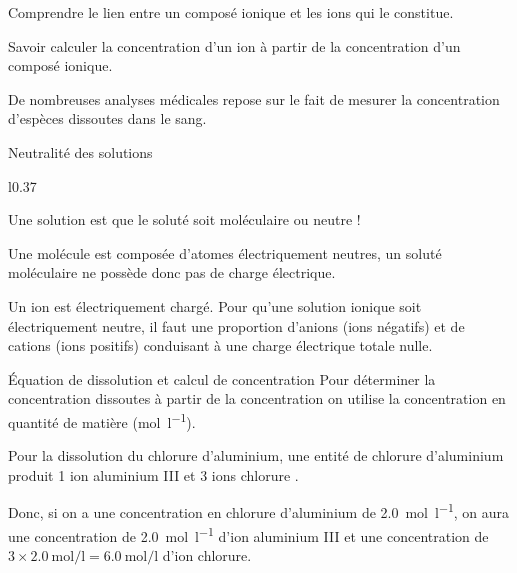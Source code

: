 \teteTermStssDosa
{}

\begin{objectifs}
  \item Comprendre le lien entre un composé ionique et les ions qui le constitue.
  \item Savoir calculer la concentration d'un ion à partir de la concentration d'un composé ionique.
\end{objectifs}

\begin{contexte}
  De nombreuses analyses médicales repose sur le fait de mesurer la concentration d'espèces dissoutes dans le sang.
  
\end{contexte}


\begin{doc}{Neutralité des solutions}
  \begin{wrapfigure}[9]{l}{0.37\linewidth}
    \vspace*{-18pt}
  \end{wrapfigure}
  Une solution est  que le soluté soit moléculaire ou neutre !

  Une molécule est composée d'atomes électriquement neutres, un soluté moléculaire ne possède donc pas de charge électrique.
  
  Un ion est électriquement chargé. Pour qu'une solution ionique soit électriquement neutre, il faut une proportion d'anions (ions négatifs) et de cations (ions positifs) conduisant à une charge électrique totale nulle.

\end{doc}

\begin{doc}{Équation de dissolution et calcul de concentration}
  Pour déterminer la concentration  dissoutes à partir de la concentration  on utilise la concentration en quantité de matière (\unit{\mole\per\litre}).
  \medskip

  \exemple Pour la dissolution du chlorure d'aluminium, une entité de chlorure d'aluminium  produit 1 ion aluminium III  et 3 ions chlorure \chlorure.

  Donc, si on a une concentration en chlorure d'aluminium de \qty{2,0}{\mole\per\litre}, on aura une concentration de \qty{2,0}{\mole\per\litre} d'ion aluminium III et une concentration de $3\times\qty{2,0}{\mole\per\litre} = \qty{6,0}{\mole\per\litre}$ d'ion chlorure.
\end{doc}

